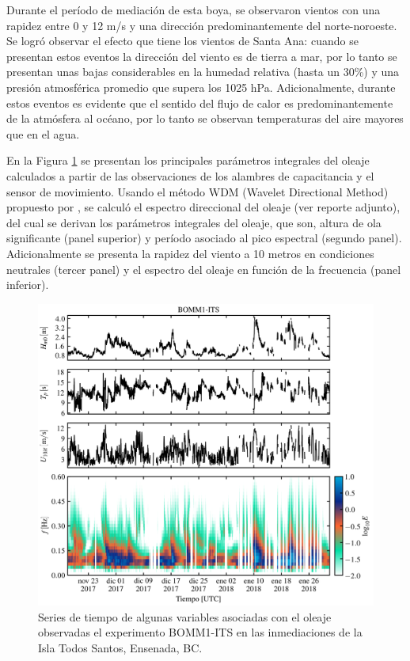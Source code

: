 \documentclass[11pt]{article}
\begin{document}
Durante el período de mediación de esta boya, se observaron vientos con una
rapidez entre 0 y 12 m/s y una dirección predominantemente del norte-noroeste.
Se logró observar el efecto que tiene los vientos de Santa Ana: cuando se
presentan estos eventos la dirección del viento es de tierra a mar, por lo tanto
se presentan unas bajas considerables en la humedad relativa (hasta un 30\%) y
una presión atmosférica promedio que supera los 1025 hPa. Adicionalmente,
durante estos eventos es evidente que el sentido del flujo de calor es
predominantemente de la atmósfera al océano, por lo tanto se observan
temperaturas del aire mayores que en el agua.

En la Figura \ref{fig:bomm1_its_wave_parameters} se presentan los principales
parámetros integrales del oleaje calculados a partir de las observaciones de los
alambres de capacitancia y el sensor de movimiento. Usando el método WDM
(Wavelet Directional Method) propuesto por \citet{Donelan1996}, se calculó el
espectro direccional del oleaje (ver reporte adjunto), del cual se derivan los
parámetros integrales del oleaje, que son, altura de ola significante (panel
superior) y período asociado al pico espectral (segundo panel). Adicionalmente
se presenta la rapidez del viento a 10 metros en condiciones neutrales (tercer
panel) y el espectro del oleaje en función de la frecuencia (panel inferior).

\begin{figure}[htpb]
  \centering
  \includegraphics[width=0.85\linewidth]{../figures/bomm1_its_wave_parameters.png}
  \caption{
    Series de tiempo de algunas variables asociadas con el oleaje observadas el
    experimento BOMM1-ITS en las inmediaciones de la Isla Todos Santos,
    Ensenada, BC.
  }
  \label{fig:bomm1_its_wave_parameters}
\end{figure}
\end{document}
